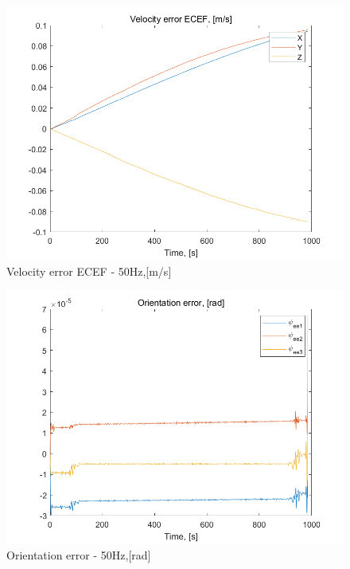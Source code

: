\documentclass[conference]{IEEEtran}
\begin{document}
\begin{figure}[htbp]
    \centerline{\includegraphics[width=1.0\columnwidth]{50fig2.png}}
    \caption{Velocity error ECEF - 50Hz,[m/s]}
\end{figure}

\begin{figure}[htbp]
    \centerline{\includegraphics[width=1.0\columnwidth]{50fig3.png}}
    \caption{Orientation error - 50Hz,[rad]}
\end{figure}
\end{document}
